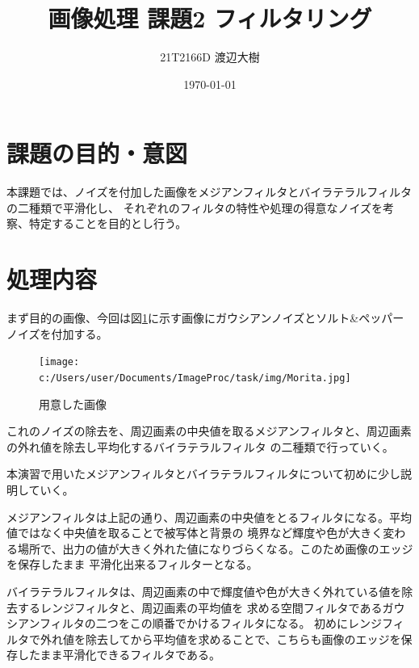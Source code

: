 \documentclass[a4paper,11pt,dvipdfmx]{jsarticle}
\begin{document}

\title{画像処理 課題2 フィルタリング}
\author{21T2166D 渡辺大樹}
\date{\today}
\maketitle

\section{課題の目的・意図}
本課題では、ノイズを付加した画像をメジアンフィルタとバイラテラルフィルタの二種類で平滑化し、
それぞれのフィルタの特性や処理の得意なノイズを考察、特定することを目的とし行う。

\section{処理内容}
まず目的の画像、今回は図\ref{Morita}に示す画像にガウシアンノイズとソルト\&ペッパーノイズを付加する。
\begin{figure}[h]
\centering
\texttt{[image: c:/Users/user/Documents/ImageProc/task/img/Morita.jpg]}
\caption{用意した画像}
\label{Morita}
\end{figure}
これのノイズの除去を、周辺画素の中央値を取るメジアンフィルタと、周辺画素の外れ値を除去し平均化するバイラテラルフィルタ
の二種類で行っていく。

本演習で用いたメジアンフィルタとバイラテラルフィルタについて初めに少し説明していく。

メジアンフィルタは上記の通り、周辺画素の中央値をとるフィルタになる。平均値ではなく中央値を取ることで被写体と背景の
境界など輝度や色が大きく変わる場所で、出力の値が大きく外れた値になりづらくなる。このため画像のエッジを保存したまま
平滑化出来るフィルターとなる。

バイラテラルフィルタは、周辺画素の中で輝度値や色が大きく外れている値を除去するレンジフィルタと、周辺画素の平均値を
求める空間フィルタであるガウシアンフィルタの二つをこの順番でかけるフィルタになる。
初めにレンジフィルタで外れ値を除去してから平均値を求めることで、こちらも画像のエッジを保存したまま平滑化できるフィルタである。
\end{document}
